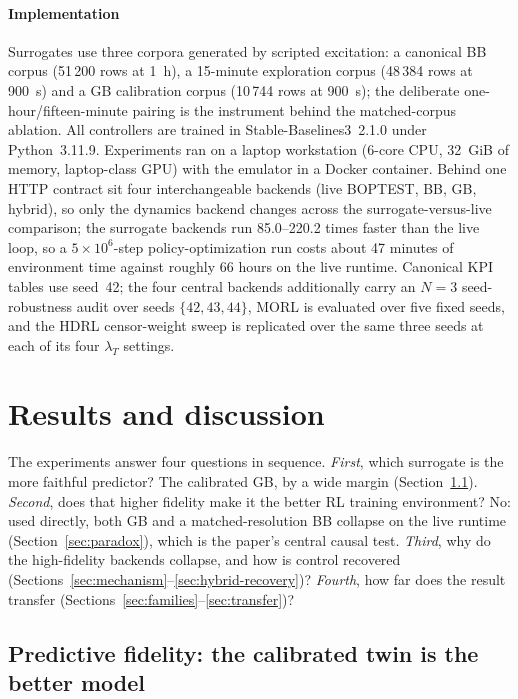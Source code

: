 \documentclass[5p]{elsarticle}
\begin{document}
\paragraph{Implementation}
Surrogates use three corpora generated by scripted excitation: a canonical BB corpus (51\,200 rows
at \SI{1}{\hour}), a 15-minute exploration corpus (48\,384 rows at \SI{900}{\second}) and a GB
calibration corpus (10\,744 rows at \SI{900}{\second}); the deliberate one-hour/fifteen-minute
pairing is the instrument behind the matched-corpus ablation. All controllers are trained in
Stable-Baselines3~2.1.0 under Python~3.11.9. Experiments ran on a laptop workstation (6-core CPU,
32~GiB of memory, laptop-class GPU) with the emulator in a Docker container. Behind one HTTP contract sit
four interchangeable backends (live BOPTEST, BB, GB, hybrid), so only the dynamics backend changes
across the surrogate-versus-live comparison; the surrogate backends run \numrange{85.0}{220.2} times
faster than the live loop, so a $5\times10^6$-step policy-optimization run costs about 47 minutes of
environment time against roughly 66 hours on the live runtime. Canonical KPI tables use seed~42; the
four central backends additionally carry an $N=3$ seed-robustness audit over seeds
$\{42,43,44\}$, MORL is evaluated over five fixed seeds, and the HDRL censor-weight sweep is replicated over the
same three seeds at each of its four $\lambda_T$ settings.

\section{Results and discussion}\label{sec:results}

The experiments answer four questions in sequence. \emph{First}, which surrogate is the more
faithful predictor? The calibrated GB, by a wide margin (Section~\ref{sec:fidelity}). \emph{Second},
does that higher fidelity make it the better RL training environment? No: used directly, both GB and
a matched-resolution BB collapse on the live runtime (Section~\ref{sec:paradox}), which is the
paper's central causal test. \emph{Third}, why do the high-fidelity backends collapse, and how is
control recovered (Sections~\ref{sec:mechanism}--\ref{sec:hybrid-recovery})? \emph{Fourth}, how far
does the result transfer (Sections~\ref{sec:families}--\ref{sec:transfer})?

\subsection{Predictive fidelity: the calibrated twin is the better model}\label{sec:fidelity}
\end{document}

